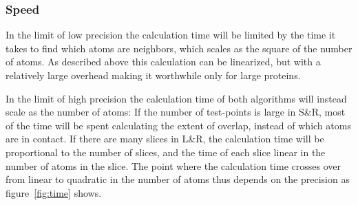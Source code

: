 \documentclass[a4paper,11pt]{article}
\begin{document}
\subsubsection{Speed}\label{sec:speed}

In the limit of low precision the calculation time will be limited by
the time it takes to find which atoms are neighbors, which scales as
the square of the number of atoms. As described above this calculation
can be linearized, but with a relatively large overhead making it
worthwhile only for large proteins.

In the limit of high precision the calculation time of both algorithms
will instead scale as the number of atoms: If the number of
test-points is large in S\&R, most of the time will be spent
calculating the extent of overlap, instead of which atoms are in
contact. If there are many slices in L\&R, the calculation time will
be proportional to the number of slices, and the time of each slice
linear in the number of atoms in the slice.  The point where the
calculation time crosses over from linear to quadratic in the number
of atoms thus depends on the precision as figure~\ref{fig:time} shows.
\end{document}
